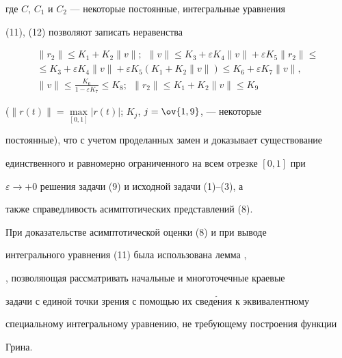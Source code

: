 где $C$, $C_1$ и $C_2$ --- некоторые постоянные, интегральные уравнения 


(11), (12) позволяют записать неравенства 


\begin{gather*} 


\|r_2\|\le K_1+K_2\|v\|; \ \ \|v\|\le K_3+ 


\varepsilon K_4\|v\|+\varepsilon K_5\|r_2\|\le \\ 


% 


\le K_3+\varepsilon K_4\|v\|+\varepsilon K_5 


(K_1+K_2\|v\|)\le K_6+\varepsilon K_7\|v\|, \\ 


% 


\|v\|\le\frac{K_6}{1-\varepsilon K_7}\le K_8; 


\ \ \|r_2\|\le K_1+K_2\|v\|\le K_9 


\end{gather*} 


($\|r(t)\|=\max\limits_{[0,1]}|r(t)|$; $K_j$, $j=\ov{1,9}$, --- некоторые 


постоянные), что с учетом проделанных замен и доказывает существование 


единственного и равномерно ограниченного на всем отрезке $[0,1]$ при 


$\varepsilon\to+0$ решения задачи (9) и исходной задачи (1)--(3), а 


также справедливость асимптотических представлений (8). 


 


При доказательстве асимптотической оценки (8) и при выводе 


интегрального уравнения (11) была использована лемма \cite{4}, 


\cite{7}, позволяющая рассматривать начальные и многоточечные краевые 


задачи с единой точки зрения с помощью их свед\'ения к эквивалентному 


специальному интегральному уравнению, не требующему построения функции 


Грина. 


 



